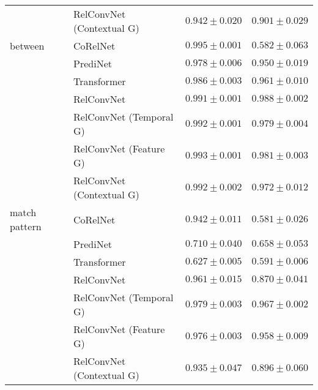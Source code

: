 \begin{tabular}{llll}
              & RelConvNet (Contextual G) &  $0.942 \pm 0.020$ &  $0.901 \pm 0.029$ \\
between & CoRelNet &  $0.995 \pm 0.001$ &  $0.582 \pm 0.063$ \\
              & PrediNet &  $0.978 \pm 0.006$ &  $0.950 \pm 0.019$ \\
              & Transformer &  $0.986 \pm 0.003$ &  $0.961 \pm 0.010$ \\
              & RelConvNet &  $0.991 \pm 0.001$ &  $0.988 \pm 0.002$ \\
              & RelConvNet (Temporal G) &  $0.992 \pm 0.001$ &  $0.979 \pm 0.004$ \\
              & RelConvNet (Feature G) &  $0.993 \pm 0.001$ &  $0.981 \pm 0.003$ \\
              & RelConvNet (Contextual G) &  $0.992 \pm 0.002$ &  $0.972 \pm 0.012$ \\
match pattern & CoRelNet &  $0.942 \pm 0.011$ &  $0.581 \pm 0.026$ \\
              & PrediNet &  $0.710 \pm 0.040$ &  $0.658 \pm 0.053$ \\
              & Transformer &  $0.627 \pm 0.005$ &  $0.591 \pm 0.006$ \\
              & RelConvNet &  $0.961 \pm 0.015$ &  $0.870 \pm 0.041$ \\
              & RelConvNet (Temporal G) &  $0.979 \pm 0.003$ &  $0.967 \pm 0.002$ \\
              & RelConvNet (Feature G) &  $0.976 \pm 0.003$ &  $0.958 \pm 0.009$ \\
              & RelConvNet (Contextual G) &  $0.935 \pm 0.047$ &  $0.896 \pm 0.060$ \\
\bottomrule
\end{tabular}
